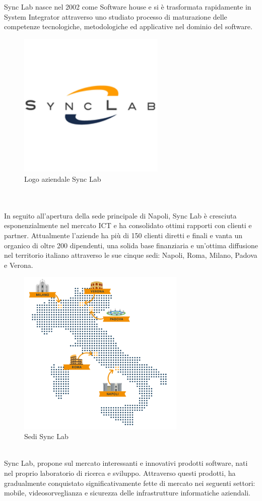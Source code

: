Sync Lab \cite{synclab} nasce nel 2002 come Software house e si è trasformata rapidamente in System Integrator attraverso uno studiato processo di maturazione delle competenze tecnologiche, metodologiche ed applicative nel dominio del software.
\\
\begin{figure}[htbp]	
		\centering
		\includegraphics[width=7cm]{immagini/logo.png}
		\caption{Logo aziendale Sync Lab}
		\label{fig:Logo aziendale Sync Lab}
\end{figure}
\\
\\
In seguito all'apertura della sede principale di Napoli, Sync Lab è cresciuta esponenzialmente nel mercato ICT e ha consolidato ottimi rapporti con clienti e partner.
Attualmente l'aziende ha più di 150 clienti diretti e finali e vanta un organico di oltre 200 dipendenti, una solida base finanziaria e un'ottima diffusione nel territorio italiano attraverso le sue cinque sedi: Napoli, Roma, Milano, Padova e Verona.
\\
\begin{figure}[htbp]	
	\centering
	\includegraphics[width=8cm]{immagini/sedi.png}
	\caption{Sedi Sync Lab}
	\label{fig:Sedi Sync Lab}
\end{figure}
\\
Sync Lab, propone sul mercato interessanti e innovativi prodotti software, nati nel proprio laboratorio di ricerca e sviluppo. Attraverso questi prodotti, ha gradualmente conquistato significativamente fette di mercato nei seguenti settori: mobile, videosorveglianza e sicurezza delle infrastrutture informatiche aziendali.

